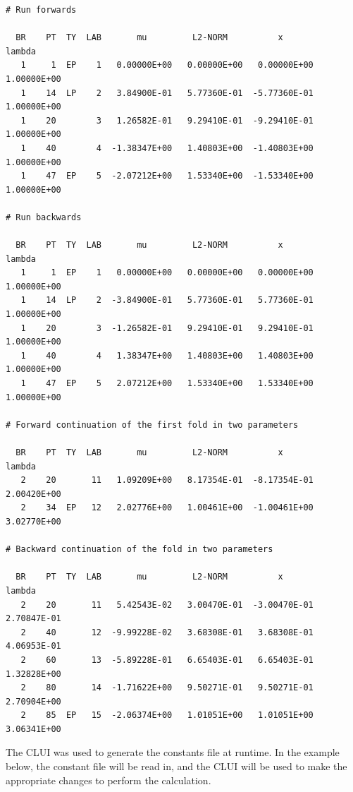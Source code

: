 \documentclass[12pt]{report}
\begin{document}
\begin{center}
\vspace{-0.2in}
\begin{verbatim}
# Run forwards
 
  BR    PT  TY  LAB       mu         L2-NORM          x           lambda    
   1     1  EP    1   0.00000E+00   0.00000E+00   0.00000E+00   1.00000E+00
   1    14  LP    2   3.84900E-01   5.77360E-01  -5.77360E-01   1.00000E+00
   1    20        3   1.26582E-01   9.29410E-01  -9.29410E-01   1.00000E+00
   1    40        4  -1.38347E+00   1.40803E+00  -1.40803E+00   1.00000E+00
   1    47  EP    5  -2.07212E+00   1.53340E+00  -1.53340E+00   1.00000E+00

# Run backwards
 
  BR    PT  TY  LAB       mu         L2-NORM          x           lambda    
   1     1  EP    1   0.00000E+00   0.00000E+00   0.00000E+00   1.00000E+00
   1    14  LP    2  -3.84900E-01   5.77360E-01   5.77360E-01   1.00000E+00
   1    20        3  -1.26582E-01   9.29410E-01   9.29410E-01   1.00000E+00
   1    40        4   1.38347E+00   1.40803E+00   1.40803E+00   1.00000E+00
   1    47  EP    5   2.07212E+00   1.53340E+00   1.53340E+00   1.00000E+00

# Forward continuation of the first fold in two parameters
 
  BR    PT  TY  LAB       mu         L2-NORM          x           lambda    
   2    20       11   1.09209E+00   8.17354E-01  -8.17354E-01   2.00420E+00
   2    34  EP   12   2.02776E+00   1.00461E+00  -1.00461E+00   3.02770E+00

# Backward continuation of the fold in two parameters

  BR    PT  TY  LAB       mu         L2-NORM          x           lambda    
   2    20       11   5.42543E-02   3.00470E-01  -3.00470E-01   2.70847E-01
   2    40       12  -9.99228E-02   3.68308E-01   3.68308E-01   4.06953E-01
   2    60       13  -5.89228E-01   6.65403E-01   6.65403E-01   1.32828E+00
   2    80       14  -1.71622E+00   9.50271E-01   9.50271E-01   2.70904E+00
   2    85  EP   15  -2.06374E+00   1.01051E+00   1.01051E+00   3.06341E+00
\end{verbatim}
\end{center}

The CLUI was used to generate the constants
file at runtime.  In the example below, the constant file 
will be read in, and the CLUI will be used to make the appropriate
changes to perform the calculation.
\end{document}
